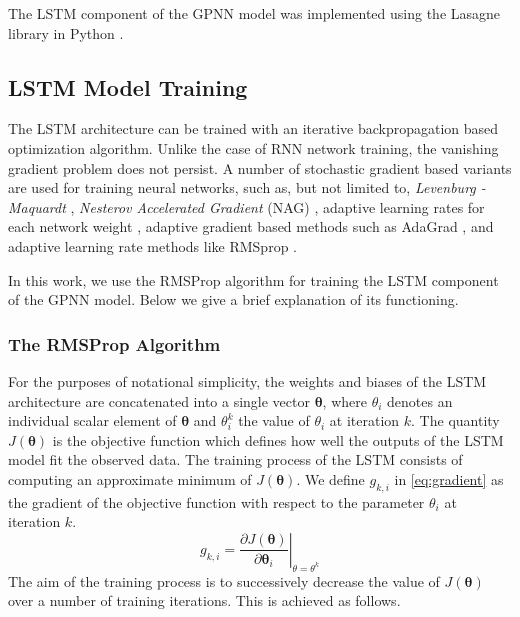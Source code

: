 The LSTM component of the GPNN model was implemented using the Lasagne library in Python 
\citep{lasagne,theanoshort}. 

\subsection{LSTM Model Training}

The LSTM architecture can be trained with an iterative backpropagation based optimization 
algorithm. Unlike the case of RNN network training, the vanishing gradient problem does not 
persist. A number of stochastic gradient based variants are used for training neural networks, 
such as, but not limited to, \emph{Levenburg - Maquardt} \citep{marquardt1963algorithm}, 
\emph{Nesterov Accelerated Gradient} (NAG) \citep{nesterov1983method}, adaptive learning rates 
for each network weight \citep{SilvaAlmeida}, adaptive gradient based methods such as AdaGrad 
\citep{duchi2011adaptive}, and adaptive learning rate methods like RMSprop 
\citep{tieleman2012lecture}. 

In this work, we use the RMSProp algorithm for training the LSTM component of the GPNN model. 
Below we give a brief explanation of its functioning.

\subsubsection*{The RMSProp Algorithm}

For the purposes of notational simplicity, the weights and biases of the LSTM architecture are 
concatenated into a single vector $\mathbf{\theta}$, where $\theta_i$ denotes an individual 
scalar element of $\mathbf{\theta}$ and $\theta^{k}_{i}$ the value of $\theta_i$ at iteration $k$. 
The quantity $J(\mathbf{\theta})$ is the objective function which defines how well the outputs of 
the LSTM model fit the observed data. The training process of the LSTM consists of computing an 
approximate minimum of $J(\mathbf{\theta})$. We define $g_{k,i}$ in \cref{eq:gradient} as the 
gradient of the objective function with respect to the parameter $\theta_{i}$ at iteration $k$. 
%
\begin{equation}\label{eq:gradient}
 g_{k,i} = \left. \frac{\partial{J}(\mathbf{\theta})}{{\partial \mathbf{\theta}_i}}\right\rvert_{\theta = \theta^k}
\end{equation}
%
The aim of the training process is to successively decrease the value of $J(\mathbf{\theta})$ over 
a number of training iterations. This is achieved as follows.

